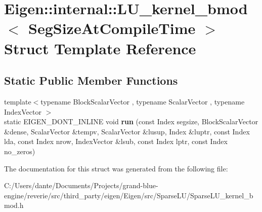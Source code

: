 \hypertarget{struct_eigen_1_1internal_1_1_l_u__kernel__bmod}{}\section{Eigen\+::internal\+::L\+U\+\_\+kernel\+\_\+bmod$<$ Seg\+Size\+At\+Compile\+Time $>$ Struct Template Reference}
\label{struct_eigen_1_1internal_1_1_l_u__kernel__bmod}
\subsection*{Static Public Member Functions}
\begin{DoxyCompactItemize}
\item 
\mbox{\label{struct_eigen_1_1internal_1_1_l_u__kernel__bmod_a475f853efdc24aaca3444da518f40ba8}} 
{\footnotesize template$<$typename Block\+Scalar\+Vector , typename Scalar\+Vector , typename Index\+Vector $>$ }\\static E\+I\+G\+E\+N\+\_\+\+D\+O\+N\+T\+\_\+\+I\+N\+L\+I\+NE void {\bfseries run} (const Index segsize, Block\+Scalar\+Vector \&dense, Scalar\+Vector \&tempv, Scalar\+Vector \&lusup, Index \&luptr, const Index lda, const Index nrow, Index\+Vector \&lsub, const Index lptr, const Index no\+\_\+zeros)
\end{DoxyCompactItemize}


The documentation for this struct was generated from the following file\+:\begin{DoxyCompactItemize}
\item 
C\+:/\+Users/dante/\+Documents/\+Projects/grand-\/blue-\/engine/reverie/src/third\+\_\+party/eigen/\+Eigen/src/\+Sparse\+L\+U/Sparse\+L\+U\+\_\+kernel\+\_\+bmod.\+h\end{DoxyCompactItemize}
